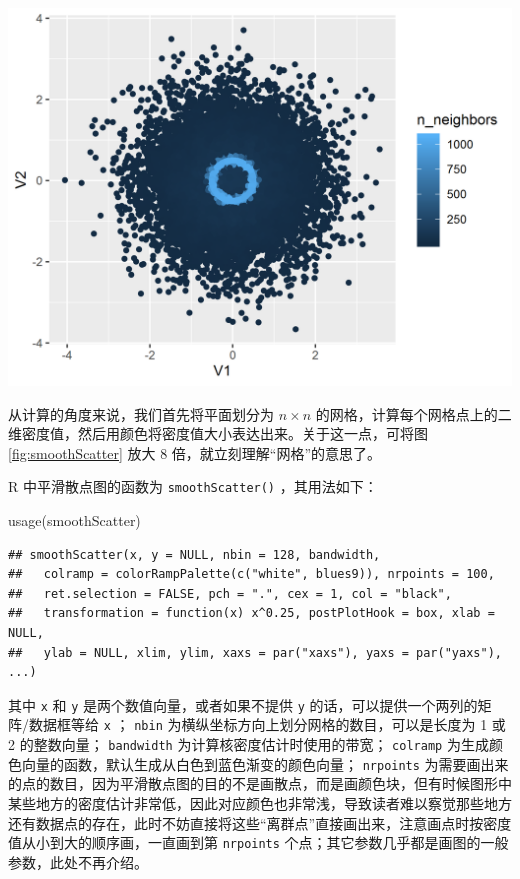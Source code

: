 \documentclass[
  b5paper,
  UTF8,twoside]{book}
\newenvironment{Shaded}{\begin{snugshade}}{\end{snugshade}}
\newcommand{\FunctionTok}[1]{\textcolor[rgb]{0.00,0.00,0.00}{#1}}
\newcommand{\NormalTok}[1]{#1}
\begin{document}
\begin{center}\includegraphics{images/smoothScatter-ggplot} \end{center}

从计算的角度来说，我们首先将平面划分为 \(n\times n\) 的网格，计算每个网格点上的二维密度值，然后用颜色将密度值大小表达出来。关于这一点，可将图 \ref{fig:smoothScatter} 放大 8 倍，就立刻理解``网格''的意思了。

R 中平滑散点图的函数为 \texttt{smoothScatter()} ，其用法如下：

\begin{Shaded}
\begin{Highlighting}[]
\FunctionTok{usage}\NormalTok{(smoothScatter)}
\end{Highlighting}
\end{Shaded}

\begin{verbatim}
## smoothScatter(x, y = NULL, nbin = 128, bandwidth,
##   colramp = colorRampPalette(c("white", blues9)), nrpoints = 100,
##   ret.selection = FALSE, pch = ".", cex = 1, col = "black",
##   transformation = function(x) x^0.25, postPlotHook = box, xlab = NULL,
##   ylab = NULL, xlim, ylim, xaxs = par("xaxs"), yaxs = par("yaxs"), ...)
\end{verbatim}

其中 \texttt{x} 和 \texttt{y} 是两个数值向量，或者如果不提供 \texttt{y} 的话，可以提供一个两列的矩阵/数据框等给 \texttt{x} ； \texttt{nbin} 为横纵坐标方向上划分网格的数目，可以是长度为 1 或 2 的整数向量； \texttt{bandwidth} 为计算核密度估计时使用的带宽； \texttt{colramp} 为生成颜色向量的函数，默认生成从白色到蓝色渐变的颜色向量； \texttt{nrpoints} 为需要画出来的点的数目，因为平滑散点图的目的不是画散点，而是画颜色块，但有时候图形中某些地方的密度估计非常低，因此对应颜色也非常浅，导致读者难以察觉那些地方还有数据点的存在，此时不妨直接将这些``离群点''直接画出来，注意画点时按密度值从小到大的顺序画，一直画到第 \texttt{nrpoints} 个点；其它参数几乎都是画图的一般参数，此处不再介绍。
\end{document}
